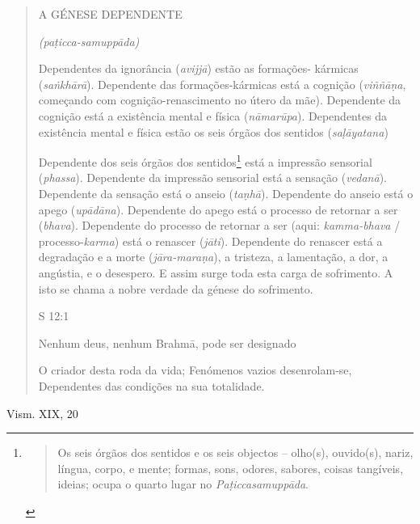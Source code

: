 \begin{quote}
A GÉNESE DEPENDENTE

\emph{(paṭicca-samuppāda)}

Dependentes da ignorância (\emph{avijjā}) estão as formações- kármicas (\emph{saṅkhārā}). Dependente das formações-kármicas está a cognição (\emph{viññāṇa}, começando com cognição-renascimento no útero da mãe). Dependente da cognição está a existência mental e física (\emph{nāmarūpa}). Dependentes da existência mental e física estão os seis órgãos dos sentidos (\emph{saḷāyatana})

Dependente dos seis órgãos dos sentidos\footnote{\begin{quote}
  Os seis órgãos dos sentidos e os seis objectos -- olho(s), ouvido(s), nariz, língua, corpo, e mente; formas, sons, odores, sabores, coisas tangíveis, ideias; ocupa o quarto lugar no \emph{Paṭiccasamuppāda}.
  \end{quote}} está a impressão sensorial (\emph{phassa}). Dependente da impressão sensorial está a sensação (\emph{vedanā}). Dependente da sensação está o anseio (\emph{taṇhā}). Dependente do anseio está o apego (\emph{upādāna}). Dependente do apego está o processo de retornar a ser (\emph{bhava}). Dependente do processo de retornar a ser (aqui: \emph{kamma-bhava} / processo-\emph{karma}) está o renascer (\emph{jāti}). Dependente do renascer está a degradação e a morte (\emph{jāra-maraṇa}), a tristeza, a lamentação, a dor, a angústia, e o desespero. E assim surge toda esta carga de sofrimento. A isto se chama a nobre verdade da génese do sofrimento.

S 12:1

Nenhum deus, nenhum Brahmā, pode ser designado

O criador desta roda da vida; Fenómenos vazios desenrolam-se, Dependentes das condições na sua totalidade.
\end{quote}

Vism. XIX, 20

